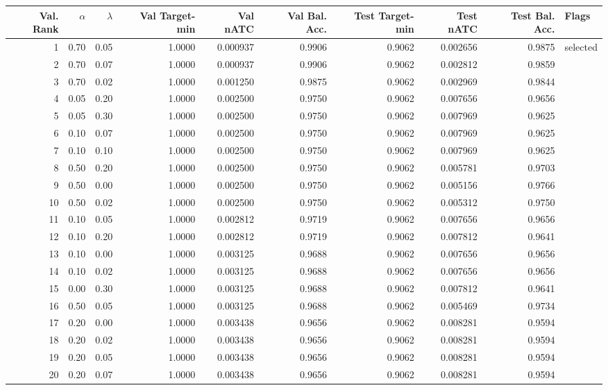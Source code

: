 \begin{tabular}{r r r r r r r r r l}
\toprule
Val. Rank & $\alpha$ & $\lambda$ & Val Target-min & Val nATC & Val Bal. Acc. & Test Target-min & Test nATC & Test Bal. Acc. & Flags \\
\midrule
1 & 0.70 & 0.05 & 1.0000 & 0.000937 & 0.9906 & 0.9062 & 0.002656 & 0.9875 & selected \\
2 & 0.70 & 0.07 & 1.0000 & 0.000937 & 0.9906 & 0.9062 & 0.002812 & 0.9859 &  \\
3 & 0.70 & 0.02 & 1.0000 & 0.001250 & 0.9875 & 0.9062 & 0.002969 & 0.9844 &  \\
4 & 0.05 & 0.20 & 1.0000 & 0.002500 & 0.9750 & 0.9062 & 0.007656 & 0.9656 &  \\
5 & 0.05 & 0.30 & 1.0000 & 0.002500 & 0.9750 & 0.9062 & 0.007969 & 0.9625 &  \\
6 & 0.10 & 0.07 & 1.0000 & 0.002500 & 0.9750 & 0.9062 & 0.007969 & 0.9625 &  \\
7 & 0.10 & 0.10 & 1.0000 & 0.002500 & 0.9750 & 0.9062 & 0.007969 & 0.9625 &  \\
8 & 0.50 & 0.20 & 1.0000 & 0.002500 & 0.9750 & 0.9062 & 0.005781 & 0.9703 &  \\
9 & 0.50 & 0.00 & 1.0000 & 0.002500 & 0.9750 & 0.9062 & 0.005156 & 0.9766 &  \\
10 & 0.50 & 0.02 & 1.0000 & 0.002500 & 0.9750 & 0.9062 & 0.005312 & 0.9750 &  \\
11 & 0.10 & 0.05 & 1.0000 & 0.002812 & 0.9719 & 0.9062 & 0.007656 & 0.9656 &  \\
12 & 0.10 & 0.20 & 1.0000 & 0.002812 & 0.9719 & 0.9062 & 0.007812 & 0.9641 &  \\
13 & 0.10 & 0.00 & 1.0000 & 0.003125 & 0.9688 & 0.9062 & 0.007656 & 0.9656 &  \\
14 & 0.10 & 0.02 & 1.0000 & 0.003125 & 0.9688 & 0.9062 & 0.007656 & 0.9656 &  \\
15 & 0.00 & 0.30 & 1.0000 & 0.003125 & 0.9688 & 0.9062 & 0.007812 & 0.9641 &  \\
16 & 0.50 & 0.05 & 1.0000 & 0.003125 & 0.9688 & 0.9062 & 0.005469 & 0.9734 &  \\
17 & 0.20 & 0.00 & 1.0000 & 0.003438 & 0.9656 & 0.9062 & 0.008281 & 0.9594 &  \\
18 & 0.20 & 0.02 & 1.0000 & 0.003438 & 0.9656 & 0.9062 & 0.008281 & 0.9594 &  \\
19 & 0.20 & 0.05 & 1.0000 & 0.003438 & 0.9656 & 0.9062 & 0.008281 & 0.9594 &  \\
20 & 0.20 & 0.07 & 1.0000 & 0.003438 & 0.9656 & 0.9062 & 0.008281 & 0.9594 &  \\

\end{tabular}
